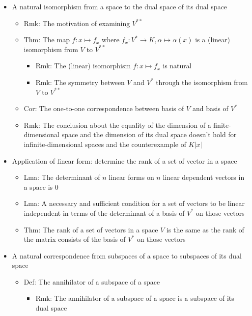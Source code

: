 \documentclass[onecolumn]{ctexart}
\begin{document}
\begin{itemize}
\begin{itemize}
\begin{itemize}
    \end{itemize}
  \end{itemize}
  \item A natural isomorphism from a space to the dual space of its dual space
  \begin{itemize}
    \item Rmk: The motivation of examining $V^{**}$
    \item Thm: The map $f: x \mapsto f_x$ where $f_x: V^* \to K, \alpha \mapsto \alpha(x)$ is a (linear) isomorphism from $V$ to $V^{**}$
    \begin{itemize}
      \item Rmk: The (linear) isomorphism $f: x \mapsto f_x$ is natural
      \item Rmk: The symmetry between $V$ and $V^*$ through the isomorphism from $V$ to $V^{**}$
    \end{itemize}
    \item Cor: The one-to-one correspondence between basis of $V$ and basis of $V^*$
    \item Rmk: The conclusion about the equality of the dimension of a finite-dimensional space and the dimension of its dual space doesn't hold for infinite-dimensional spaces and the counterexample of $K\left\lvert x \right\rvert$
  \end{itemize}
  \item Application of linear form: determine the rank of a set of vector in a space
  \begin{itemize}
    \item Lma: The determinant of $n$ linear forms on $n$ linear dependent vectors in a space is $0$
    \item Lma: A necessary and sufficient condition for a set of vectors to be linear independent in terms of the determinant of a basis of $V^*$ on those vectors
    \item Thm: The rank of a set of vectors in a space $V$ is the same as the rank of the matrix consists of the basis of $V^*$ on those vectors
  \end{itemize}
  \item A natural correspondence from subspaces of a space to subspaces of its dual space
  \begin{itemize}
    \item Def: The annihilator of a subspace of a space
    \begin{itemize}
      \item Rmk: The annihilator of a subspace of a space is a subspace of its dual space

\end{itemize}
\end{itemize}
\end{itemize}
\end{document}
